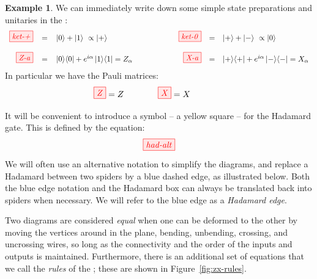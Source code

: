 \documentclass[a4paper,onecolumn,superscriptaddress,11pt,accepted=2020-04-27]{quantumarticle}
\newcommand{\bra}[1]{\ensuremath{\left\langle #1 \right|}}
\newcommand{\ket}[1]{\ensuremath{\left|  #1 \right\rangle}}
\newcommand{\ketbra}[2]{\ensuremath{\ket{#1}\!\bra{#2}}}
\theoremstyle{definition}
\newtheorem{example}[theorem]{Example}
\begin{document}
\begin{example}\label{ex:basic-maps-and-states}
  We can immediately write down some simple state preparations and
  unitaries in the \zxcalculus:
  \[
  \begin{array}{rclcrcl}
  \tikzfig{ket-+} & = & \ket{0} + \ket{1} \ \propto \ket{+} &
  \qquad\qquad &
  \tikzfig{ket-0} & = & \ket{+} + \ket{-} \ \propto \ket{0} \\
  &\quad& & & \quad \\
  \tikzfig{Z-a} & = & \ketbra{0}{0} + e^{i \alpha} \ketbra{1}{1} =
  Z_\alpha &
  & 
  \tikzfig{X-a} & = & \ketbra{+}{+} + e^{i \alpha} \ketbra{-}{-} = X_\alpha
  \end{array}
  \]
  In particular we have the Pauli matrices:
  \[
  \hfill
  \tikzfig{Z} = Z \qquad\qquad   \tikzfig{X} = X \qquad\qquad
  \hfill
  \]
\end{example}
It will be convenient to introduce a symbol -- a yellow square -- for
the Hadamard gate. This is defined by the equation:
\begin{equation}\label{eq:Hdef}
\hfill
\tikzfig{had-alt}
\hfill
\end{equation}
We will often use an alternative notation to simplify the diagrams,
and replace a Hadamard between two spiders by a blue dashed edge, as
illustrated below.
%
%
Both the blue edge notation and the Hadamard box can always be
translated back into spiders when necessary. We will refer to the blue
edge as a \emph{Hadamard edge}.

Two diagrams are considered \emph{equal} when one can be deformed to
the other by moving the vertices around in the plane, bending,
unbending, crossing, and uncrossing wires, so long as the connectivity
and the order of the inputs and outputs is maintained.  
Furthermore, there is an additional set of equations that we call the \emph{rules} of the \zxcalculus; these are shown in
Figure~\ref{fig:zx-rules}.
\end{document}
